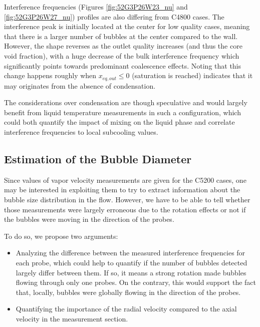 \npar

Interference frequencies (Figures \ref{fig:52G3P26W23_nu} and \ref{fig:52G3P26W27_nu}) profiles are also differing from C4800 cases. The interference peak is initially located at the center for low quality cases, meaning that there is a larger number of bubbles at the center compared to the wall. However, the shape reverses as the outlet quality increases (and thus the core void fraction), with a huge decrease of the bulk interference frequency which significantly points towards predominant coalescence effects. Noting that this change happens roughly when $x_{eq,out} \leq 0$ (saturation is reached) indicates that it may originates from the absence of condensation.   

\begin{remark*}{}
The considerations over condensation are though speculative and would largely benefit from liquid temperature measurements in such a configuration, which could both quantify the impact of mixing on the liquid phase and correlate interference frequencies to local subcooling values.
\end{remark*}


\subsection{Estimation of the Bubble Diameter}
\label{subsec:debprom_dV_exp}

Since values of vapor velocity measurements are given for the C5200 cases, one may be interested in exploiting them to try to extract information about the bubble size distribution in the flow. However, we have to be able to tell whether those measurements were largely erroneous due to the rotation effects or not \ie if the bubbles were moving in the direction of the probes.

\npar

To do so, we propose two arguments:

\begin{itemize}
\item Analyzing the difference between the measured interference frequencies for each probe, which could help to quantify if the number of bubbles detected largely differ between them. If so, it means a strong rotation made bubbles flowing through only one probes. On the contrary, this would support the fact that, locally, bubbles were globally flowing in the direction of the probes.

\item Quantifying the importance of the radial velocity compared to the axial velocity in the measurement section.
\end{itemize}


